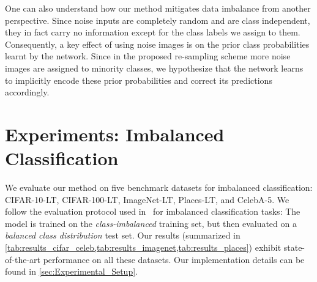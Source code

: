 \documentclass[nohyperref]{article}
\theoremstyle{plain}
\theoremstyle{definition}
\theoremstyle{remark}
\begin{document}
One can also understand how our method mitigates data imbalance from another perspective. Since noise inputs are completely random and are class independent, they in fact carry no information except for the class labels we assign to them. Consequently, a key effect of using noise images is on the prior class probabilities learnt by the network. Since in the proposed re-sampling scheme more noise images are assigned to minority classes, we hypothesize that the network learns to implicitly encode these prior probabilities and correct its predictions accordingly.

 
\vspace{-0.2cm}
\section{Experiments:  Imbalanced Classification}\label{sec:experiments}
\vspace{-0.1cm}
We evaluate our method on five  benchmark datasets for imbalanced classification: CIFAR-10-LT, CIFAR-100-LT, ImageNet-LT, Places-LT, and CelebA-5. 
We follow the evaluation protocol used in~\cite{liu2019large, kim2020m2m} for imbalanced classification tasks: 
The model is trained on the \textit{class-imbalanced} training set, but then evaluated on a  \textit{balanced class distribution} test set. 
Our results (summarized in \cref{tab:results_cifar_celeb,tab:results_imagenet,tab:results_places}) exhibit state-of-the-art performance on all these datasets. Our implementation details can be found in \cref{sec:Experimental_Setup}.

\vspace{-0.5em}
\end{document}
